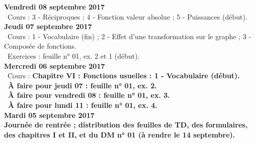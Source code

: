 \documentclass[12pt,a4paper]{article}
\begin{document}
\noindent\textbf{Vendredi 08 septembre 2017}\\
\bu\ Cours : 3 - Réciproques ; 4 - Fonction valeur absolue ; 5 - Puissances (début).\vspace{.4cm}\\

\noindent\textbf{\bf Jeudi 07 septembre 2017}\\
\bu\ Cours : 1 - Vocabulaire (fin) ; 2 - Effet d'une transformation sur le graphe ; 3 - Composée de fonctions.\\
\bu\ Exercices : feuille n° 01, ex. 2 et 1 (début).\vspace{.4cm}\\
   
\noindent\textbf{\bf Mercredi 06 septembre 2017}\\
\bu\ Cours : \bf Chapitre VI \rm : Fonctions usuelles : 1 - Vocabulaire (début).\\
\bu\ À faire pour jeudi 07 : feuille n° 01, ex. 2.\\
\bu\ À faire pour vendredi 08 : feuille n° 01, ex. 3.\\
\bu\ À faire pour lundi 11 : feuille n° 01, ex. 4.\vspace{.4cm}\\

\noindent\textbf{\bf Mardi 05 septembre 2017}\\
Journée de rentrée ; distribution des feuilles de TD, des formulaires, des
chapitres I et II, et du DM n° 01 (à rendre le 14 septembre).\vspace{.4cm}\\


\label{end}
\end{document}

